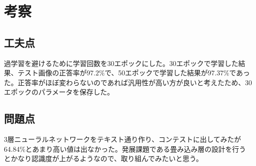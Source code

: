 \documentclass{ujarticle}
\begin{document}
\section{考察}
\subsection{工夫点}
過学習を避けるために学習回数を30エポックにした。30エポックで学習した結果、テスト画像の正答率が$97.2\%$で、50エポックで学習した結果が$97.37\%$であった。正答率がほぼ変わらないのであれば汎用性が高い方が良いと考えたため、30エポックのパラメータを保存した。

\subsection{問題点}
3層ニューラルネットワークをテキスト通り作り、コンテストに出してみたが64.84\%とあまり高い値は出なかった。発展課題である畳み込み層の設計を行うとかなり認識度が上がるようなので、取り組んでみたいと思う。
\end{document}

